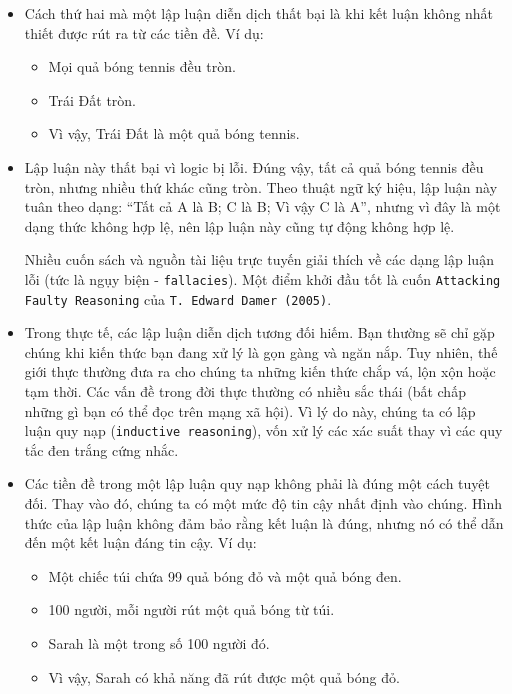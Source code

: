 \begin{itemize}
    \item Cách thứ hai mà một lập luận diễn dịch thất bại là khi kết luận không nhất thiết được rút ra từ các tiền đề. Ví dụ:
    \begin{itemize}
        \item Mọi quả bóng tennis đều tròn.
        \item Trái Đất tròn.
        \item Vì vậy, Trái Đất là một quả bóng tennis.
    \end{itemize}

    \item Lập luận này thất bại vì logic bị lỗi. Đúng vậy, tất cả quả bóng tennis đều tròn, nhưng nhiều thứ khác cũng tròn. Theo thuật ngữ ký hiệu, lập luận này tuân theo dạng: “Tất cả A là B; C là B; Vì vậy C là A”, nhưng vì đây là một dạng thức không hợp lệ, nên lập luận này cũng tự động không hợp lệ.

\begin{tcolorbox}
Nhiều cuốn sách và nguồn tài liệu trực tuyến giải thích về các dạng lập luận lỗi (tức là ngụy biện - \texttt{fallacies}). Một điểm khởi đầu tốt là cuốn \texttt{Attacking Faulty Reasoning} của \texttt{T. Edward Damer (2005)}.
\end{tcolorbox}

    \item Trong thực tế, các lập luận diễn dịch tương đối hiếm. Bạn thường sẽ chỉ gặp chúng khi kiến thức bạn đang xử lý là gọn gàng và ngăn nắp. Tuy nhiên, thế giới thực thường đưa ra cho chúng ta những kiến thức chắp vá, lộn xộn hoặc tạm thời. Các vấn đề trong đời thực thường có nhiều sắc thái (bất chấp những gì bạn có thể đọc trên mạng xã hội). Vì lý do này, chúng ta có lập luận quy nạp (\texttt{inductive reasoning}), vốn xử lý các xác suất thay vì các quy tắc đen trắng cứng nhắc.

    \item Các tiền đề trong một lập luận quy nạp không phải là đúng một cách tuyệt đối. Thay vào đó, chúng ta có một mức độ tin cậy nhất định vào chúng. Hình thức của lập luận không đảm bảo rằng kết luận là đúng, nhưng nó có thể dẫn đến một kết luận đáng tin cậy. Ví dụ:
    \begin{itemize}
        \item Một chiếc túi chứa 99 quả bóng đỏ và một quả bóng đen.
        \item 100 người, mỗi người rút một quả bóng từ túi.
        \item Sarah là một trong số 100 người đó.
        \item Vì vậy, Sarah có khả năng đã rút được một quả bóng đỏ.
    \end{itemize}


\end{itemize}
